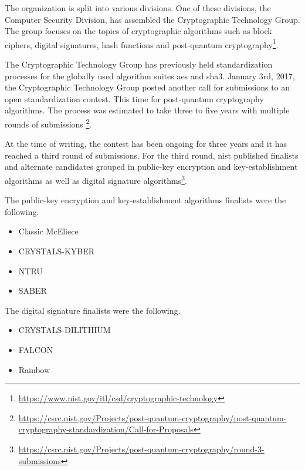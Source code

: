 The organization is split into various divisions. One of these divisions, the Computer Security Division, has assembled the Cryptographic Technology Group. The group focuses on the topics of cryptographic algorithms such as block ciphers, digital signatures, hash functions and post-quantum cryptography\footnote{\href{https://www.nist.gov/itl/csd/cryptographic-technology}{https://www.nist.gov/itl/csd/cryptographic-technology}}.

The Cryptographic Technology Group has previously held standardization processes for the globally used algorithm suites \gls{aes} and \gls{sha3}. January 3rd, 2017, the Cryptographic Technology Group posted another call for submissions to an open standardization contest. This time for post-quantum cryptography algorithms. The process was estimated to take three to five years with multiple rounds of submissions \footnote{\href{https://csrc.nist.gov/Projects/post-quantum-cryptography/post-quantum-cryptography-standardization/Call-for-Proposals}{https://csrc.nist.gov/Projects/post-quantum-cryptography/post-quantum-cryptography-standardization/Call-for-Proposals}}.

At the time of writing, the contest has been ongoing for three years and it has reached a third round of submissions. For the third round, \gls{nist} published finalists and alternate candidates grouped in public-key encryption and key-establishment algorithms as well as digital signature algorithms\footnote{\href{https://csrc.nist.gov/Projects/post-quantum-cryptography/round-3-submissions}{https://csrc.nist.gov/Projects/post-quantum-cryptography/round-3-submissions}}.

The public-key encryption and key-establishment algorithms finalists were the following.

\begin{itemize}
    \item Classic McEliece
    \item CRYSTALS-KYBER
    \item NTRU
    \item SABER
\end{itemize}

The digital signature finalists were the following.

\begin{itemize}
    \item CRYSTALS-DILITHIUM
    \item FALCON
    \item Rainbow
\end{itemize}

